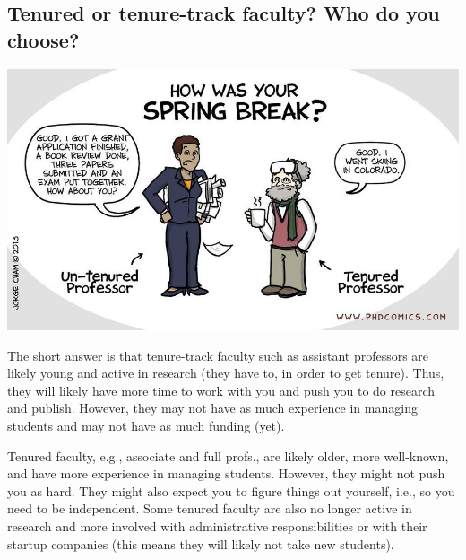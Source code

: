 \documentclass[oneside,11pt]{memoir}
\newenvironment{commentbox}[1][]{
  \small
  \begin{mybox}
    {\small \textbf{#1}}
  }{
  \end{mybox}
}
\begin{document}
\subsection{Tenured or tenure-track faculty? Who do you choose?}\label{sec:tenure-vs-tenure-track}

\begin{center}
  \includegraphics[scale=0.4]{files/c8.png}
\end{center}


The short answer is that tenure-track faculty such as assistant professors are likely young and active in research (they have to, in order to get tenure). Thus, they will likely have more time to work with you and push you to do research and publish. However, they may not have as much experience in managing students and may not have as much funding (yet).

Tenured faculty, e.g., associate and full profs., are likely older, more well-known, and have more experience in managing students.  However, they might not push you as hard. They might also expect you to figure things out yourself, i.e., so you need to be independent.  Some tenured faculty are also no longer active in research and more involved with administrative responsibilities or with their startup companies (this means they will likely not take new students).

\end{document}
